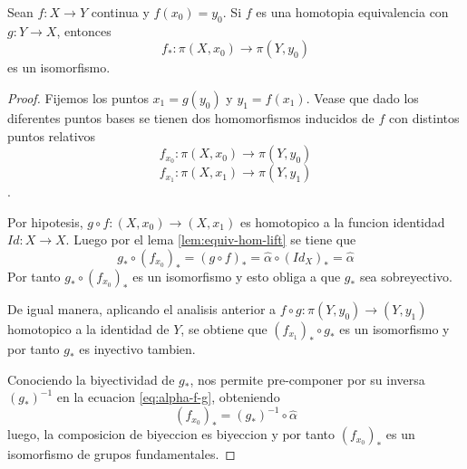 \begin{teorema}
  Sean \(f : X \to Y\) continua y \(f (x_0) = y_0\). Si \(f\) es una
  homotopia equivalencia con \(g : Y \to X\), entonces
  \[ f_* : \pi (X, x_0) \to \pi (Y, y_0)\]
  es un isomorfismo.
\end{teorema}
\begin{proof}
  Fijemos los puntos \(x_1 = g(y_0)\) y \(y_1 = f(x_1)\). Vease que dado
  los diferentes puntos bases se tienen dos homomorfismos inducidos de
  \(f\) con distintos puntos relativos \[f_{x_0} : \pi (X, x_0) \to \pi
  (Y, y_0)\] \[f_{x_1} : \pi (X, x_1) \to \pi (Y, y_1)\].

  Por hipotesis, \(g \circ f : (X, x_0) \to (X, x_1)\) es homotopico a
  la funcion identidad \(Id : X \to X\). Luego por el lema
  \ref{lem:equiv-hom-lift} se tiene que
  \begin{equation} \label{eq:alpha-f-g}
  g_* \circ (f_{x_0})_* = (g \circ f)_* = \hat \alpha \circ (Id_X)_*
    = \hat \alpha
  \end{equation}
  Por tanto \(g_* \circ (f_{x_0})_*\) es un isomorfismo y esto obliga a
  que \(g_*\) sea sobreyectivo.

  De igual manera, aplicando el analisis anterior a \(f \circ g : \pi
  (Y, y_0) \to (Y, y_1)\) homotopico a la identidad de \(Y\), se
  obtiene que \((f_{x_1})_* \circ g_*\) es un isomorfismo y por tanto
  \(g_*\) es inyectivo tambien.

  Conociendo la biyectividad de \(g_*\), nos permite pre-componer por su
  inversa \((g_*)^{-1}\) en la ecuacion \eqref{eq:alpha-f-g}, obteniendo
  \[ (f_{x_0})_* = (g_*)^{-1} \circ \hat \alpha\]
  luego, la composicion de biyeccion es biyeccion y por tanto
  \((f_{x_0})_*\) es un isomorfismo de grupos fundamentales.
\end{proof}